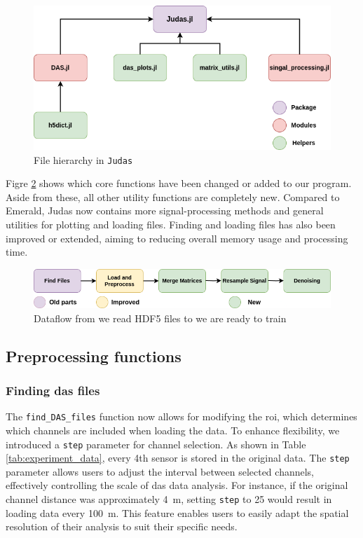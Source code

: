 \begin{figure}[!h]
    \centering
    \includegraphics[scale=.5]{figures/judas_overview.png}
    \caption{File hierarchy in \texttt{Judas}}
    \label{fig:judasoverview}
\end{figure}

Figre \ref{fig:apiflow} shows which core functions have been changed or added to our program. Aside from these, all other utility functions are completely new. Compared to Emerald, Judas now contains more signal-processing methods and general utilities for plotting and loading files. Finding and loading files has also been improved or extended, aiming to reducing overall memory usage and processing time.
\\

\begin{figure}[!h]
    \centering
    \includegraphics[scale=0.5]{figures/dataflow.png}
    \caption{Dataflow from we read HDF5 files to we are ready to train}
    \label{fig:apiflow}
\end{figure}


\subsection{Preprocessing functions}

\subsubsection{Finding \acrshort{das} files}

The \texttt{find\_DAS\_files} function now allows for modifying the \acrfull{roi}, which determines which channels are included when loading the data. To enhance flexibility, we introduced a \texttt{step} parameter for channel selection. As shown in Table \ref{tab:experiment_data}, every 4th sensor is stored in the original data. The \texttt{step} parameter allows users to adjust the interval between selected channels, effectively controlling the scale of \acrshort{das} data analysis. For instance, if the original channel distance was approximately \qty{4}{\meter}, setting \texttt{step} to 25 would result in loading data every \qty{100}{\meter}. This feature enables users to easily adapt the spatial resolution of their analysis to suit their specific needs.

